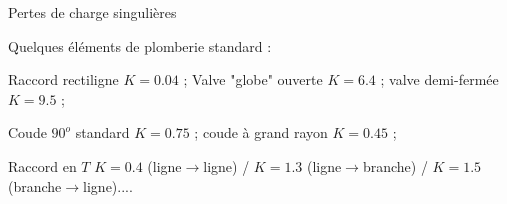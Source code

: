 \begin{frame}{Pertes de charge singulières}
\begin{center}
\begin{picture}
  \end{picture}
\end{center}

Quelques éléments de plomberie standard :

Raccord rectiligne $K = 0.04$ ;  Valve "globe" ouverte $K = 6.4$ ; valve demi-fermée $K = 9.5$ ; 

Coude $90^o$ standard $K= 0.75$ ; coude à grand rayon $K = 0.45$ ;

Raccord en $T$ $K = 0.4$ (ligne$\rightarrow$ligne) / $K=1.3$ 
(ligne$\rightarrow$branche) / $K=1.5$ (branche$\rightarrow$ligne)....

\vspace{0mm}

\end{frame}


